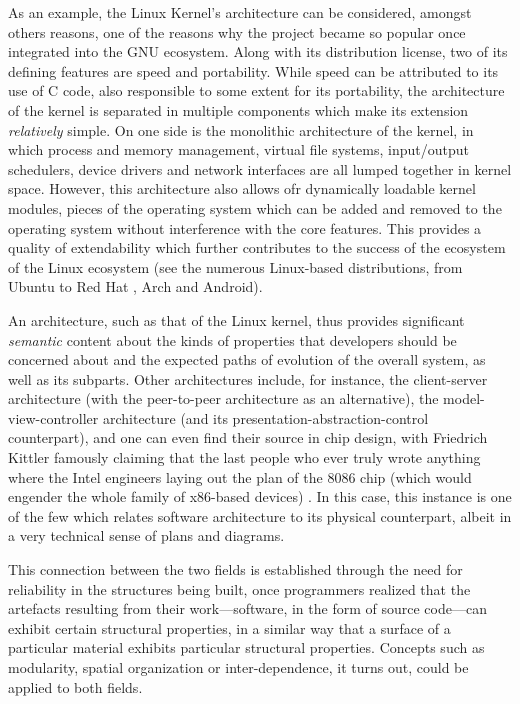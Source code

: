 As an example, the Linux Kernel's architecture can be considered, amongst others reasons, one of the reasons why the project became so popular once integrated into the GNU ecosystem. Along with its distribution license, two of its defining features are speed and portability. While speed can be attributed to its use of C code, also responsible to some extent for its portability, the architecture of the kernel is separated in multiple components which make its extension \emph{relatively} simple. On one side is the monolithic architecture of the kernel, in which process and memory management, virtual file systems, input/output schedulers, device drivers and network interfaces are all lumped together in kernel space. However, this architecture also allows ofr dynamically loadable kernel modules, pieces of the operating system which can be added and removed to the operating system without interference with the core features. This provides a quality of extendability which further contributes to the success of the ecosystem of the Linux ecosystem (see the numerous Linux-based distributions, from Ubuntu to Red Hat , Arch and Android).

An architecture, such as that of the Linux kernel, thus provides significant \emph{semantic} content about the kinds of properties that developers should be concerned about and the expected paths of evolution of the overall system, as well as its subparts. Other architectures include, for instance, the client-server architecture (with the peer-to-peer architecture as an alternative), the model-view-controller architecture (and its presentation-abstraction-control counterpart), and one can even find their source in chip design, with Friedrich Kittler famously claiming that the last people who ever truly wrote anything where the Intel engineers laying out the plan of the 8086 chip (which would engender the whole family of x86-based devices) \citep{kittler_there_1997}. In this case, this instance is one of the few which relates software architecture to its physical counterpart, albeit in a very technical sense of plans and diagrams.

This connection between the two fields is established through the need for reliability in the structures being built, once programmers realized that the artefacts resulting from their work—software, in the form of source code—can exhibit certain structural properties, in a similar way that a surface of a particular material exhibits particular structural properties. Concepts such as modularity, spatial organization or inter-dependence, it turns out, could be applied to both fields.

